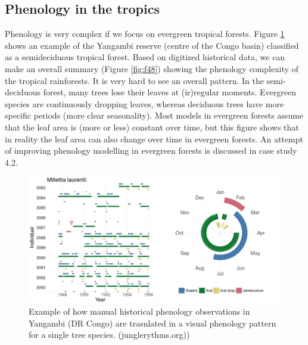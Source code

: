 \documentclass[12pt,oneside]{book}
\begin{document}
\subsection{Phenology in the tropics}\label{phenology-in-the-tropics}

Phenology is very complex if we focus on evergreen tropical forests.
Figure \ref{fig:f47} shows an example of the Yangambi reserve (centre of
the Congo basin) classified as a semideciduous tropical forest. Based on
digitized historical data, we can make an overall summary (Figure
\ref{fig:f48}) showing the phenology complexity of the tropical
rainforests. It is very hard to see an overall pattern. In the
semi-deciduous forest, many trees lose their leaves at (ir)regular
moments. Evergreen species are continuously dropping leaves, whereas
deciduous trees have more specific periods (more clear seasonality).
Most models in evergreen forests assume that the leaf area is (more or
less) constant over time, but this figure shows that in reality the leaf
area can also change over time in evergreen forests. An attempt of
improving phenology modelling in evergreen forests is discussed in case
study 4.2.

\begin{figure}

{\centering \includegraphics[width=0.8\linewidth]{figures/chap4/f49_junglerythms} 

}

\caption{Example of how manual historical phenology observations in Yangambi (DR Congo) are trasnlated in a visual phenology pattern for a single tree species. (junglerythms.org))}\label{fig:f47}
\end{figure}
\end{document}
